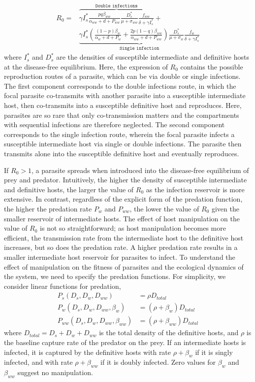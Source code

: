 \documentclass[11pt]{article}
\begin{document}
\begin{align}
R_0 = & \overbrace{\gamma I_s^* \frac{ p q \beta_{ww}}{\alpha_{ww} + d + P_{ww}} \frac{D_s^*}{\mu +\sigma_{ww}} \frac{f_{ww}}{\delta +\gamma I_s^*}}^{ \texttt{Double infections}} + \nonumber \\
& \underbrace{\gamma  I_s^* \left( \frac{ (1-p)\beta_w}{\alpha_w + d + P_w} + \frac{2 p (1-q) \beta_{ww}}{\alpha_{ww} + d + P_{ww}} \right) \frac{D_s^*}{\mu + \sigma_w} \frac{f_w}{\delta +\gamma  I_s^*}}_{\texttt{Single infection}}
\end{align}
%
where $I_s^*$ and $D_s^*$ are the densities of susceptible intermediate and definitive hosts at the disease-free equilibrium. 
Here, the expression of $R_0$ contains the possible reproduction routes of a parasite, which can be via double or single infections. 
The first component corresponds to the double infections route, in which the focal parasite co-transmits with another parasite into a susceptible intermediate host, then co-transmits into a susceptible definitive host and reproduces. 
Here, parasites are so rare that only co-transmission matters and the compartments with sequential infections are therefore neglected. 
The second component corresponds to the single infection route, wherein the focal parasite infects a susceptible intermediate host via single or double infections. 
The parasite then transmits alone into the susceptible definitive host and eventually reproduces. 


If $R_0 > 1$, a parasite spreads when introduced into the disease-free equilibrium of prey and predator.
Intuitively, the higher the density of susceptible intermediate and definitive hosts, the larger the value of $R_0$ as the infection reservoir is more extensive. 
In contrast, regardless of the explicit form of the predation function, the higher the predation rate $P_w$ and $P_{ww}$, the lower the value of $R_0$ given the smaller reservoir of intermediate hosts. 
The effect of host manipulation on the value of $R_0$ is not so straightforward; as host manipulation becomes more efficient, the transmission rate from the intermediate host to the definitive host increases, but so does the predation rate. 
A higher predation rate results in a smaller intermediate host reservoir for parasites to infect. 
To understand the effect of manipulation on the fitness of parasites and the ecological dynamics of the system, we need to specify the predation functions. 
For simplicity, we consider linear functions for predation,
%
\begin{align*}
 P_s(D_s, D_w, D_{ww}) &= \rho D_{total}  \\
 P_w(D_s, D_w, D_{ww}, \beta_w) &= (\rho + \beta_w) D_{total} \\
 P_{ww}(D_s, D_w, D_{ww}, \beta_{ww}) &=  (\rho + \beta_{ww})D_{total}
\end{align*}
%
where $D_{total} = D_s + D_w + D_{ww}$ is the total density of the definitive hosts, and $\rho$ is the baseline capture rate of the predator on the prey. If an intermediate hosts is infected, it is captured by the definitive hosts with rate $\rho + \beta_w$ if it is singly infected, and with rate $\rho + \beta_{ww}$ if it is doubly infected. Zero values for $\beta_w$ and $\beta_{ww}$ suggest no manipulation. 
\end{document}
